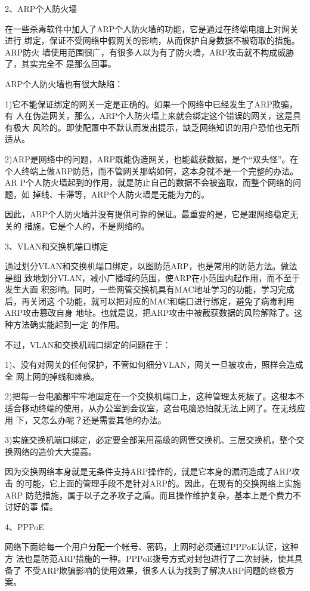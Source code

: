 \documentclass[letterpaper,10pt]{sphinxmanual}
\begin{document}
2、ARP个人防火墙

在一些杀毒软件中加入了ARP个人防火墙的功能，它是通过在终端电脑上对网关进行
绑定，保证不受网络中假网关的影响，从而保护自身数据不被窃取的措施。ARP防火
墙使用范围很广，有很多人以为有了防火墙，ARP攻击就不构成威胁了，其实完全不
是那么回事。

ARP个人防火墙也有很大缺陷：

1)它不能保证绑定的网关一定是正确的。如果一个网络中已经发生了ARP欺骗，有
人在伪造网关，那么，ARP个人防火墙上来就会绑定这个错误的网关，这是具有极大
风险的。即使配置中不默认而发出提示，缺乏网络知识的用户恐怕也无所适从。

2)ARP是网络中的问题，ARP既能伪造网关，也能截获数据，是个“双头怪”。在
个人终端上做ARP防范，而不管网关那端如何，这本身就不是一个完整的办法。AR
P个人防火墙起到的作用，就是防止自己的数据不会被盗取，而整个网络的问题，如
掉线、卡滞等，ARP个人防火墙是无能为力的。

因此，ARP个人防火墙并没有提供可靠的保证。最重要的是，它是跟网络稳定无关的
措施，它是个人的，不是网络的。

3、VLAN和交换机端口绑定

通过划分VLAN和交换机端口绑定，以图防范ARP，也是常用的防范方法。做法是细
致地划分VLAN，减小广播域的范围，使ARP在小范围内起作用，而不至于发生大面
积影响。同时，一些网管交换机具有MAC地址学习的功能，学习完成后，再关闭这
个功能，就可以把对应的MAC和端口进行绑定，避免了病毒利用ARP攻击篡改自身
地址。也就是说，把ARP攻击中被截获数据的风险解除了。这种方法确实能起到一定
的作用。

不过，VLAN和交换机端口绑定的问题在于：

1)、没有对网关的任何保护，不管如何细分VLAN，网关一旦被攻击，照样会造成全
网上网的掉线和瘫痪。

2)把每一台电脑都牢牢地固定在一个交换机端口上，这种管理太死板了。这根本不
适合移动终端的使用，从办公室到会议室，这台电脑恐怕就无法上网了。在无线应用
下，又怎么办呢？还是需要其他的办法。

3)实施交换机端口绑定，必定要全部采用高级的网管交换机、三层交换机，整个交
换网络的造价大大提高。

因为交换网络本身就是无条件支持ARP操作的，就是它本身的漏洞造成了ARP攻击
的可能，它上面的管理手段不是针对ARP的。因此，在现有的交换网络上实施ARP
防范措施，属于以子之矛攻子之盾。而且操作维护复杂，基本上是个费力不讨好的事
情。

4、PPPoE

网络下面给每一个用户分配一个帐号、密码，上网时必须通过PPPoE认证，这种方
法也是防范ARP措施的一种。PPPoE拨号方式对封包进行了二次封装，使其具备了
不受ARP欺骗影响的使用效果，很多人认为找到了解决ARP问题的终极方案。
\end{document}
